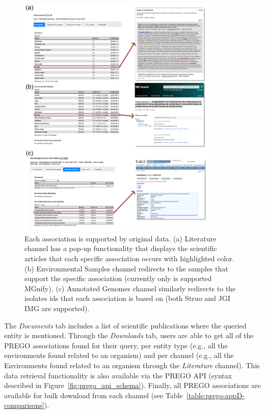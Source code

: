    \begin{figure}[h]
      \centering
      \includegraphics[width=0.85\textwidth]{figures/prego_ui_resources.png}
      \caption[PREGO in action - examples]{ 
         Each association is supported by original data. 
         (a) Literature channel has a pop-up functionality that displays the scientific articles that each specific association occurs with highlighted color. 
         (b) Environmental Samples channel redirects to the samples that support the specific association (currently only is supported MGnify). 
         (c) Annotated Genomes channel similarly redirects to the isolates ids that each association is based on (both Struo and JGI IMG are supported).
      }
      \label{fig:prego_ui_resources}
   \end{figure}


   The \textit{Documents} tab includes a list of scientific publications where the queried entity is mentioned. 
   Through the \textit{Downloads} tab, users are able to get all of the PREGO associations found for their query, per entity type (e.g., all the environments found related to an organism) and per channel (e.g., all the Environments found related to an organism through the \textit{Literature} channel). 
   This data retrieval functionality is also available via the PREGO API (syntax described in Figure~\ref{fig:prego_api_schema}). Finally, all PREGO associations are available for bulk download from each channel (see Table~\ref{table:prego-appD-comparisons}).



